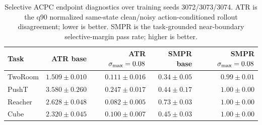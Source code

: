 \begin{table}[H]
\centering
\caption{Selective ACPC endpoint diagnostics over training seeds 3072/3073/3074. ATR is the q90 normalized same-state clean/noisy action-conditioned rollout disagreement; lower is better. SMPR is the task-grounded near-boundary selective-margin pass rate; higher is better.}
\label{tab:atr-smpr-selective-acpc}
\small
\setlength{\tabcolsep}{4pt}
\begin{tabular}{lrrrr}
\toprule
Task & ATR base & ATR $\sigma_{\max}=0.08$ & SMPR base & SMPR $\sigma_{\max}=0.08$ \\
\midrule
TwoRoom & $1.509 \pm 0.010$ & $0.111 \pm 0.016$ & $0.34 \pm 0.05$ & $0.99 \pm 0.01$ \\
PushT & $3.580 \pm 0.260$ & $0.247 \pm 0.017$ & $0.44 \pm 0.17$ & $1.00 \pm 0.00$ \\
Reacher & $2.628 \pm 0.048$ & $0.082 \pm 0.005$ & $0.73 \pm 0.03$ & $1.00 \pm 0.00$ \\
Cube & $2.320 \pm 0.045$ & $0.100 \pm 0.007$ & $0.45 \pm 0.03$ & $1.00 \pm 0.00$ \\
\bottomrule
\end{tabular}
\end{table}
